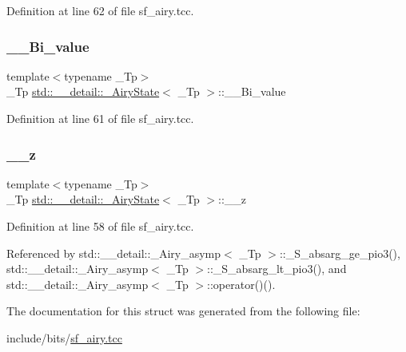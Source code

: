 Definition at line 62 of file sf\+\_\+airy.\+tcc.

\mbox{\label{structstd_1_1____detail_1_1__AiryState_a10ef7705b2b52a40502d75e62add672f}} 
\subsubsection{\texorpdfstring{\+\_\+\+\_\+\+Bi\+\_\+value}{\_\_Bi\_value}}
{\footnotesize\ttfamily template$<$typename \+\_\+\+Tp$>$ \\
\+\_\+\+Tp \hyperlink{structstd_1_1____detail_1_1__AiryState}{std\+::\+\_\+\+\_\+detail\+::\+\_\+\+Airy\+State}$<$ \+\_\+\+Tp $>$\+::\+\_\+\+\_\+\+Bi\+\_\+value}



Definition at line 61 of file sf\+\_\+airy.\+tcc.

\mbox{\label{structstd_1_1____detail_1_1__AiryState_a7606b501eba3f9b55aafa1706d7c9cc1}} 
\subsubsection{\texorpdfstring{\+\_\+\+\_\+z}{\_\_z}}
{\footnotesize\ttfamily template$<$typename \+\_\+\+Tp$>$ \\
\+\_\+\+Tp \hyperlink{structstd_1_1____detail_1_1__AiryState}{std\+::\+\_\+\+\_\+detail\+::\+\_\+\+Airy\+State}$<$ \+\_\+\+Tp $>$\+::\+\_\+\+\_\+z}



Definition at line 58 of file sf\+\_\+airy.\+tcc.



Referenced by std\+::\+\_\+\+\_\+detail\+::\+\_\+\+Airy\+\_\+asymp$<$ \+\_\+\+Tp $>$\+::\+\_\+\+S\+\_\+absarg\+\_\+ge\+\_\+pio3(), std\+::\+\_\+\+\_\+detail\+::\+\_\+\+Airy\+\_\+asymp$<$ \+\_\+\+Tp $>$\+::\+\_\+\+S\+\_\+absarg\+\_\+lt\+\_\+pio3(), and std\+::\+\_\+\+\_\+detail\+::\+\_\+\+Airy\+\_\+asymp$<$ \+\_\+\+Tp $>$\+::operator()().



The documentation for this struct was generated from the following file\+:\begin{DoxyCompactItemize}
\item 
include/bits/\hyperlink{sf__airy_8tcc}{sf\+\_\+airy.\+tcc}\end{DoxyCompactItemize}
